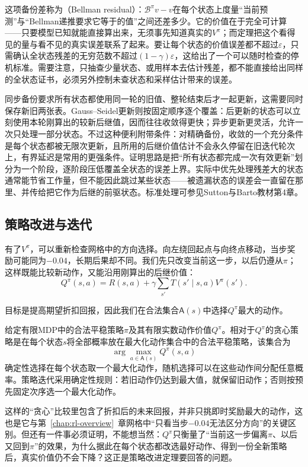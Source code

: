 这项备份差称为（Bellman residual）：$\mathcal B^\pi v-v$在每个状态上度量“当前预测”与“Bellman递推要求它等于的值”之间还差多少。它的价值在于完全可计算——只要模型已知就能直接算出来，无须事先知道真实的$V^\pi$；而定理把这个看得见的量与看不见的真实误差联系了起来。要让每个状态的价值误差都不超过$\varepsilon$，只需确认全状态残差的无穷范数不超过$(1-\gamma)\varepsilon$，这给出了一个可以随时检查的停机标准。需要注意，只抽查少量状态、或用样本去估计残差，都不能直接给出同样的全状态证书，必须另外控制未查状态和采样估计带来的误差。

同步备份要求所有状态都使用同一轮的旧值、整轮结束后才一起更新，这需要同时保存新旧两张表。Gauss--Seidel更新则按固定顺序逐个覆盖：后更新的状态可以立刻使用本轮刚算出的较新后继值，因而往往收敛得更快；异步更新更灵活，允许一次只处理一部分状态。不过这种便利附带条件：对精确备份，收敛的一个充分条件是每个状态都被无限次更新，且所用的后继价值估计不会永久停留在旧迭代轮次上，有界延迟是常用的更强条件。证明思路是把“所有状态都完成一次有效更新”划分为一个阶段，逐阶段压低覆盖全状态的误差上界。实际中优先处理残差大的状态通常能节省工作量，但不能因此跳过某些状态——被遗漏状态的误差会一直留在那里、并传给把它作为后继的前驱状态。标准处理可参见Sutton与Barto教材第4章。

\subsection{策略改进与迭代}
\label{sec:rl-planning-policy-iteration}

有了$V^\pi$，可以重新检查网格中的方向选择。向左绕回起点与向终点移动，当步奖励可能同为$-0.04$，长期后果却不同。我们先只改变当前这一步，以后仍遵从$\pi$；这样既能比较新动作，又能沿用刚算出的后继价值：
\[
 Q^\pi(s,a)=R(s,a)+\gamma\sum_{s'}T(s'\mid s,a)V^\pi(s').
\]

目标是提高期望折扣回报，因此我们在合法集合$\mathsf A(s)$中选择$Q^\pi$最大的动作。

\begin{definition}[贪心策略]
 \label{def:rl-planning-greedy}
 给定有限MDP中的合法平稳策略$\pi$及其有限实数动作价值$Q^\pi$。相对于$Q^\pi$的贪心策略是在每个状态$s$将全部概率放在最大化动作集合中的合法平稳策略，该集合为
 \[
  \arg\max_{a\in\mathsf A(s)}Q^\pi(s,a)
 \]
 确定性选择在每个状态取一个最大化动作，随机选择可以在这些动作间分配任意概率。策略迭代采用确定性规则：若旧动作仍达到最大值，就保留旧动作；否则按预先固定次序选一个最大化动作。
\end{definition}

这样的“贪心”比较里包含了折扣后的未来回报，并非只挑即时奖励最大的动作，这也是它与第~\ref{chap:rl-overview}~章网格中“只看当步$-0.04$无法区分方向”的关键区别。但还有一件事必须证明，不能想当然：$Q^\pi$只衡量了“当前这一步偏离$\pi$、以后又回到$\pi$”的效果，为什么据此在每个状态都改选最好动作、得到一份全新策略后，真实价值仍不会下降？这正是策略改进定理要回答的问题。

